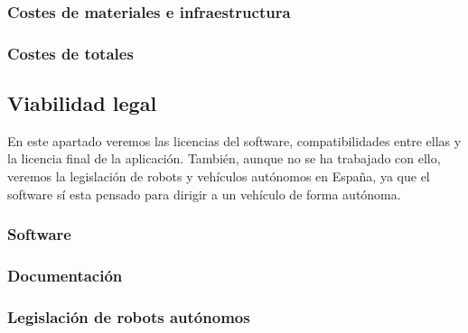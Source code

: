 \subsubsection{Costes de materiales e infraestructura}

\subsubsection{Costes de totales}

\subsection{Viabilidad legal}
En este apartado veremos las licencias del software, compatibilidades entre ellas y la licencia final de la aplicación. También, aunque no se ha trabajado con ello, veremos la legislación de robots y vehículos autónomos en España, ya que el software sí esta pensado para dirigir a un vehículo de forma autónoma.

\subsubsection{Software}

\subsubsection{Documentación}

\subsubsection{Legislación de robots autónomos}


